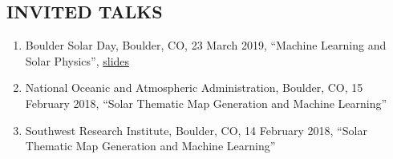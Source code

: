 \documentclass[line,margin]{res}
\begin{document}
\begin{resume}
  \section{INVITED TALKS}
  \begin{enumerate}[leftmargin=*]
  \item Boulder Solar Day, Boulder, CO, 23 March 2019, ``Machine Learning and Solar Physics'', \href{https://drive.google.com/open?id=1j5R_wpHwaYO6ZDdx2zjAtdNeyvL2uC9n}{slides}
  \item National Oceanic and Atmospheric Administration, Boulder, CO, 15 February 2018, ``Solar Thematic Map Generation and Machine Learning''
  \item Southwest Research Institute, Boulder, CO, 14 February 2018, ``Solar Thematic Map Generation and Machine Learning''
  \end{enumerate}
  

\end{resume}
\end{document}
